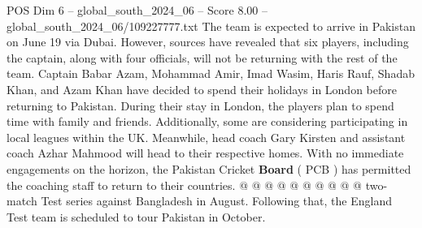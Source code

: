\begin{textsample}{POS Dim 6 – global\_south\_2024\_06 – Score 8.00 – global\_south\_2024\_06/109227777.txt}
The team is expected to arrive in Pakistan on June 19 via Dubai.
However, sources have revealed that six players, including the captain, along with four officials, will not be returning with the rest of the team.
Captain Babar Azam, Mohammad Amir, Imad Wasim, Haris Rauf, Shadab Khan, and Azam Khan have decided to spend their holidays in London before returning to Pakistan.
During their stay in London, the players plan to spend time with family and friends.
Additionally, some are considering participating in local leagues within the UK.
Meanwhile, head coach Gary Kirsten and assistant coach Azhar Mahmood will head to their respective homes.
With no immediate engagements on the horizon, the Pakistan Cricket \textbf{Board} ( PCB ) has permitted the coaching staff to return to their countries. @ @ @ @ @ @ @ @ @ @ two-match Test series against Bangladesh in August.
Following that, the England Test team is scheduled to tour Pakistan in October.

\end{textsample}
